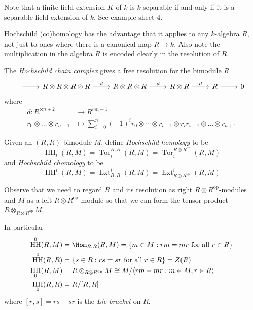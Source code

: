 \documentclass[a4paper]{article}
\DeclareMathOperator{\Tor}{Tor}
\DeclareMathOperator{\Ext}{Ext}
\newcommand{\op}{\mathrm{op}}
\DeclareMathOperator{\HH}{HH}
\begin{document}
Note that a finite field extension \(K\) of \(k\) is \(k\)-separable if and only if it is a separable field extension of \(k\). See example sheet 4.

\begin{remark}
  Hochschild (co)homology has the advantage that it applies to any \(k\)-algebra \(R\), not just to ones where there is a canonical map \(R \to k\). Also note the multiplication in the algebra \(R\) is encoded clearly in the resolution of \(R\).
\end{remark}

\begin{definition}
  The \emph{Hochschild chain complex} gives a free resolution for the bimodule \(R\)
  \[
    \begin{tikzcd}
      \ar[r] & R \otimes R \otimes R \otimes R \ar[r, "d"] & R \otimes R \otimes R \ar[r, "d"] & R \otimes R \ar[r, "\mu"] & R \ar[r] & 0
    \end{tikzcd}
  \]
  where
  \begin{align*}
    d: R^{\otimes n + 2} &\to R^{\otimes n + 1} \\
    r_0 \otimes \dots \otimes r_{n + 1} &\mapsto \sum_{i = 0}^n (-1)^i r_0 \otimes \cdots \otimes r_{i - 1} \otimes r_ir_{i + 1} \otimes \dots \otimes r_{n + 1}
  \end{align*}
\end{definition}

\begin{definition}
  Given an \((R, R)\)-bimodule \(M\), define \emph{Hochschild homology} to be
  \[
    \HH_i(R, M) = \Tor_i^{R, R} (R, M) = \Tor_i^{R \otimes R^\op}(R, M)
  \]
  and \emph{Hochschild chomology} to be
  \[
    \HH^i(R, M) = \Ext_{R, R}^i(R, M) = \Ext_{R \otimes R^\op}^i(R, M)
  \]
\end{definition}
Observe that we need to regard \(R\) and its resolution as right \(R \otimes R^\op\)-modules and \(M\) as a left \(R \otimes R^\op\)-module so that we can form the tensor product \(R \otimes_{R \otimes R^\op} M\).

In particular
\begin{align*}
  \HH^0(R, M) &= \Hom_{R, R} (R, M) = \{m \in M: rm = mr \text{ for all } r \in R\} \\
  \HH^0(R, R) &= \{s \in R: rs = sr \text{ for all } r \in R\} = Z(R) \\
  \HH_0(R, M) &= R \otimes_{R \otimes R^{\text{op}}} M \cong M / \langle rm - mr: m \in M, r \in R \rangle \\
  \HH_0(R, R) &= R/[R, R]
\end{align*}
where \([r, s] = rs - sr\) is the \emph{Lie bracket} on \(R\).
\end{document}
